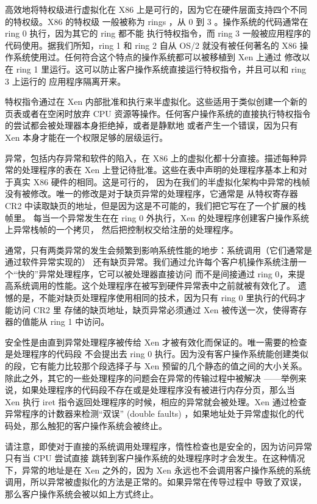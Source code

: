 高效地将特权级进行虚拟化在 X86 上是可行的，因为它在硬件层面支持四个不同的特权级。X86 的特权级
一般被称为 rings ，从 0 到 3 。操作系统的代码通常在 ring 0 执行，因为其它的 ring 都不能
执行特权指令，而 ring 3 一般被应用程序的代码使用。据我们所知，ring 1 和 ring 2 自从 OS/2
就没有被任何著名的 X86 操作系统使用过。任何符合这个特点的操作系统都可以被移植到 Xen 上通过
修改以在 ring 1 里运行。这可以防止客户操作系统直接运行特权指令，并且可以和 ring 3 上运行的
应用程序隔离开来。

特权指令通过在 Xen 内部批准和执行来半虚拟化。这些适用于类似创建一个新的页表或者在空闲时放弃
CPU 资源等操作。任何客户操作系统的直接执行特权指令的尝试都会被处理器本身拒绝掉，或者是静默地
或者产生一个错误，因为只有 Xen 本身才能在一个权限足够的层级运行。

异常，包括内存异常和软件的陷入，在 X86 上的虚拟化都十分直接。描述每种异常的处理程序的表在
Xen 上登记待批准。这些在表中声明的处理程序基本上和对于真实 X86 硬件的相同。这是可行的，
因为在我们的半虚拟化架构中异常的栈帧没有被修改。唯一的修改是对于缺页异常的处理程序，它通常是
从特权寄存器 CR2 中读取缺页的地址，但是因为这是不可能的，我们把它写在了一个扩展的栈帧里。
每当一个异常发生在在 ring 0 外执行，Xen 的处理程序创建客户操作系统上异常栈帧的一个拷贝，
然后把控制权交给注册的处理程序。

通常，只有两类异常的发生会频繁到影响系统性能的地步：系统调用（它们通常是通过软件异常实现的）
还有缺页异常。我们通过允许每个客户机操作系统注册一个“快的”异常处理程序，它可以被处理器直接访问
而不是间接通过 ring 0，来提高系统调用的性能。这个处理程序在被写到硬件异常表中之前就被有效化了。
遗憾的是，不能对缺页处理程序使用相同的技术，因为只有 ring 0 里执行的代码才能访问 CR2 里
存储的缺页地址，缺页异常必须通过 Xen 被传送一次，使得寄存器的值能从 ring 1 中访问。

安全性是由直到异常处理程序被传给 Xen 才被有效化而保证的。唯一需要的检查是处理程序的代码段
不会提出去 ring 0 执行。因为没有客户操作系统能创建类似的段，它有能力比较那个段选择子与 Xen
预留的几个静态的值之间的大小关系。除此之外，其它的一些处理程序的问题会在异常的传输过程中被解决
——举例来说，如果处理程序的代码段不存在或是处理程序没有被进行内存分页，那么当 Xen 执行 iret
指令返回处理程序的时候，相应的异常就会被处理。Xen 通过检查异常程序的计数器来检测“双误”
(double faults) ，如果地址处于异常虚拟化的代码处，那么触犯的客户操作系统会被终止。

请注意，即使对于直接的系统调用处理程序，惰性检查也是安全的，因为访问异常只有当 CPU 尝试直接
跳转到客户操作系统的处理程序时才会发生。在这种情况下，异常的地址是在 Xen 之外的，因为 Xen
永远也不会调用客户操作系统的系统调用，所以异常被虚拟化的方法是正常的。如果异常在传导过程中
导致了双误，那么客户操作系统会被以如上方式终止。

